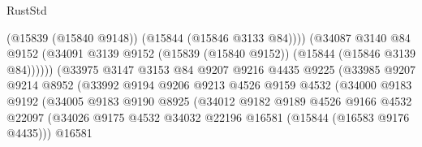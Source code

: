\begin{lexlean}{RustStd}
\begin{coremodule}
                                          (@15839 (@15840 @9148))
                                          (@15844 (@15846 @3133 @84))))
                                      (@34087
                                        @3140
                                        @84
                                        @9152
                                        (@34091
                                          @3139
                                          @9152
                                          (@15839 (@15840 @9152))
                                          (@15844 (@15846 @3139 @84))))))
                                  (@33975
                                    @3147
                                    @3153
                                    @84
                                    @9207
                                    @9216
                                    @4435
                                    @9225
                                    (@33985
                                      @9207
                                      @9214
                                      @8952
                                      (@33992
                                        @9194
                                        @9206
                                        @9213
                                        @4526
                                        @9159
                                        @4532
                                        (@34000
                                          @9183
                                          @9192
                                          (@34005
                                            @9183
                                            @9190
                                            @8925
                                            (@34012
                                              @9182
                                              @9189
                                              @4526
                                              @9166
                                              @4532
                                              @22097
                                              (@34026
                                                @9175
                                                @4532
                                                @34032
                                                @22196
                                                @16581
                                                (@15844 (@16583 @9176 @4435)))
                                              @16581

\end{coremodule}
\end{lexlean}
